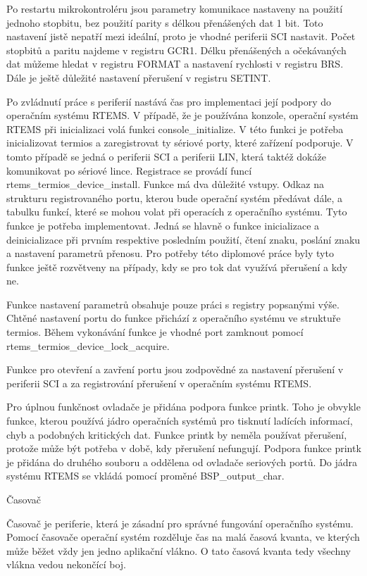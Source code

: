 Po restartu mikrokontroléru jsou parametry komunikace nastaveny na použití jednoho stopbitu, bez použití parity s délkou přenášených dat 1 bit.
Toto nastavení jistě nepatří mezi ideální, proto je vhodné periferii SCI nastavit.
Počet stopbitů a paritu najdeme v registru GCR1.
Délku přenášených a očekávaných dat můžeme hledat v registru FORMAT a nastavení rychlosti v registru BRS.
Dále je ještě důležité nastavení přerušení v registru SETINT.

Po zvládnutí práce s periferií nastává čas pro implementaci její podpory do operačním systému RTEMS.
V případě, že je používána konzole, operační systém RTEMS při inicializaci volá funkci console\_initialize.
V této funkci je potřeba inicializovat termios a zaregistrovat ty sériové porty, které zařízení podporuje.
V tomto případě se jedná o periferii SCI a periferii LIN, která taktéž dokáže komunikovat po sériové lince.
Registrace se provádí funcí rtems\_termios\_device\_install.
Funkce má dva důležité vstupy.
Odkaz na strukturu registrovaného portu, kterou bude operační systém předávat dále, a tabulku funkcí, které se mohou volat při operacích z operačního systému.
Tyto funkce je potřeba implementovat.
Jedná se hlavně o funkce inicializace a deinicializace při prvním respektive posledním použití, čtení znaku, poslání znaku a nastavení parametrů přenosu.
Pro potřeby této diplomové práce byly tyto funkce ještě rozvětveny na případy, kdy se pro tok dat využívá přerušení a kdy ne.

Funkce nastavení parametrů obsahuje pouze práci s registry popsanými výše.
Chtěné nastavení portu do funkce přichází z operačního systému ve struktuře termios.
Během vykonávání funkce je vhodné port zamknout pomocí rtems\_termios\_device\_lock\_acquire.

Funkce pro otevření a zavření portu jsou zodpovědné za nastavení přerušení v periferii SCI a za registrování přerušení v operačním systému RTEMS.

Pro úplnou funkčnost ovladače je přidána podpora funkce printk.
Toho je obvykle funkce, kterou používá jádro operačních systémů pro tisknutí ladících informací, chyb a podobných kritických dat.
Funkce printk by neměla používat přerušení, protože může být potřeba v době, kdy přerušení nefungují.
Podpora funkce printk je přidána do druhého souboru a oddělena od ovladače seriových portů.
Do jádra systému RTEMS se vkládá pomocí proměné BSP\_output\_char.

\secc        Časovač

	Časovač je periferie, která je zásadní pro správné fungování operačního systému.
Pomocí časovače operační systém rozděluje čas na malá časová kvanta, ve kterých může běžet vždy jen jedno aplikační vlákno.
O tato časová kvanta tedy všechny vlákna vedou nekončící boj.

